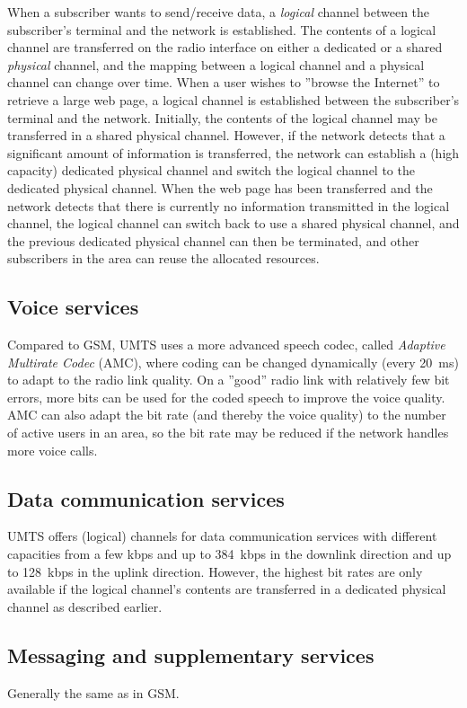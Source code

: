When a subscriber wants to send/receive data, a \emph{logical} channel between the subscriber's terminal and the network is established. The contents of a logical channel are transferred on the radio interface on either a dedicated or a shared \emph{physical} channel, and the mapping between a logical channel and a physical channel can change over time. When a user wishes to ''browse the Internet'' to retrieve a large web page, a logical channel is established between the subscriber's terminal and the network. Initially, the contents of the logical channel may be transferred in a shared physical channel. However, if the network detects that a significant amount of information is transferred, the network can establish a (high capacity) dedicated physical channel and switch the logical channel to the dedicated physical channel. When the web page has been transferred and the network detects that there is currently no information transmitted in the logical channel, the logical channel can switch back to use a shared physical channel, and the previous dedicated physical channel can then be terminated, and other subscribers in the area can reuse the allocated resources.

\subsection{Voice services}
Compared to GSM, UMTS uses a more advanced speech codec, called \emph{Adaptive Multirate Codec} (AMC), where coding can be changed dynamically (every 20~ms) to adapt to the radio link quality. On a ''good'' radio link with relatively few bit errors, more bits can be used for the coded speech to improve the voice quality. AMC can also adapt the bit rate (and thereby the voice quality) to the number of active users in an area, so the bit rate may be reduced if the network handles more voice calls.


\subsection{Data communication services}
UMTS offers (logical) channels for data communication services with different capacities from a few kbps and up to 384~kbps in the downlink direction and up to 128~kbps in the uplink direction. However, the highest bit rates are only available if the logical channel's contents are transferred in a dedicated physical channel as described earlier.

\subsection{Messaging and supplementary services}
Generally the same as in GSM.

